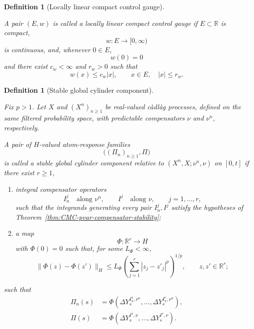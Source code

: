 \documentclass[a4paper,10pt]{article}
\newtheorem{defin}[thm]{Definition}
\begin{document}
\begin{defin}[Locally linear compact control gauge]
\label{def:locally-linear-compact-gauge}

A pair \((E,w)\) is called a locally linear compact control gauge if
\(E\subset\mathbb R\) is compact,
\[
        w:E\longrightarrow[0,\infty)
\]
is continuous, and, whenever \(0\in E\),
\[
        w(0)=0
\]
and there exist \(c_w<\infty\) and \(r_w>0\) such that
\[
        w(x)\le c_w|x|,
        \qquad x\in E,\quad |x|\le r_w.
\]
\end{defin}


\begin{defin}[Stable global cylinder component]
\label{def:stable-global-cylinder-component}

Fix \(p>1\). Let \(X\) and \((X^n)_{n\ge1}\) be real-valued
càdlàg processes, defined on the same filtered probability space,
with predictable compensators \(\nu\) and \(\nu^n\), respectively.

A pair of \(H\)-valued atom-response families
\[
        \bigl((\Pi_n)_{n\ge1},\Pi\bigr)
\]
is called a stable global cylinder component relative to
\((X^n,X;\nu^n,\nu)\) on \([0,t]\) if there exist \(r\ge1\),

\begin{enumerate}

\item integral compensator operators
\[
        I_n^j
        \quad\text{along }\nu^n,
        \qquad
        I^j
        \quad\text{along }\nu,
        \qquad j=1,\ldots,r,
\]
such that the integrands generating every pair \(I_n^j,I^j\)
satisfy the hypotheses of
Theorem~\ref{thm:CMC-pvar-compensator-stability};

\item a map
\[
        \Phi:\mathbb R^r\longrightarrow H
\]
with \(\Phi(0)=0\) such that, for some \(L_\Phi<\infty\),
\[
\lVert\Phi(z)-\Phi(z')\rVert_H
\le
L_\Phi
\left(
        \sum_{j=1}^r|z_j-z'_j|^p
\right)^{1/p},
\qquad z,z'\in\mathbb R^r;
\]

\end{enumerate}

such that
\[
\begin{aligned}
\Pi_n(s)
&=
\Phi\left(
        \Delta Y_s^{I_n^1,\nu^n},
        \ldots,
        \Delta Y_s^{I_n^r,\nu^n}
\right),
\\
\Pi(s)
&=
\Phi\left(
        \Delta Y_s^{I^1,\nu},
        \ldots,
        \Delta Y_s^{I^r,\nu}
\right).
\end{aligned}
\]
\end{defin}
\end{document}
